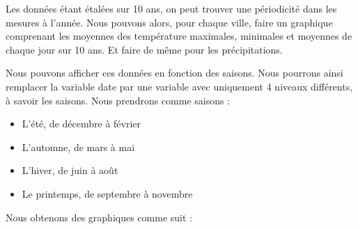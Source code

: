 \documentclass{article}
\begin{document}
Les données étant étalées sur 10 ans, on peut trouver une périodicité dans les mesures à l'année. Nous pouvons alors, pour chaque ville, faire un graphique comprenant les moyennes des température maximales, minimales et moyennes de chaque jour sur 10 ans. Et faire de même pour les précipitations. 

Nous pouvons afficher ces données en fonction des saisons. Nous pourrons ainsi remplacer la variable date par une variable avec uniquement 4 niveaux différents, à savoir les saisons. Nous prendrons comme saisons : 

\begin{itemize}
    \item L’été, de décembre à février
    \item L’automne, de mars à mai
    \item L’hiver, de juin à août
    \item Le printemps, de septembre à novembre
\end{itemize}

Nous obtenons des graphiques comme suit : 
\end{document}
